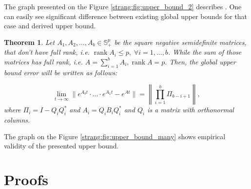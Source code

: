 \documentclass{article}
\newtheorem{theorem}{Theorem}
\begin{document}
The graph presented on the Figure \ref{strang:fig:upper_bound_2} describes . One can easily see significant difference between existing global upper bounds for that case \cite{sheng1994global} and derived upper bound.

\begin{theorem}\label{strang:theorem_uppbound}
    Let $A_1, A_2, \ldots, A_b \in \mathbb{S}^p_{+}$ be the square negative semidefinite matrices, that don't have full rank, i.e. $\operatorname{rank}{A_i} \leq p, \;\forall i = 1, \ldots, b$. While the sum of those matrices has full rank, i.e. $A = \sum\limits_{i=1}^b A_i, \operatorname{rank}{A} = p$. Then, the global upper bound error will be written as follows:

    \begin{equation}\label{strang:global_error_upper_bound}
        \lim_{t \to \infty}\| e^{A_bt} \cdot \ldots \cdot e^{A_1t} - e^{At}\| = \left\|\prod\limits_{i=1}^b \Pi_{b-i+1}\right\|,
    \end{equation}
    where $\Pi_i = I - Q_iQ_i^*$ and $A_i = Q_iB_iQ_i^*$ and $Q_i$ is a matrix with orthonormal columns. 
\end{theorem}

The graph on the Figure \ref{strang:fig:upper_bound_many} shows empirical validity of the presented upper bound.



\section{Proofs}

\llsls*
\end{document}
